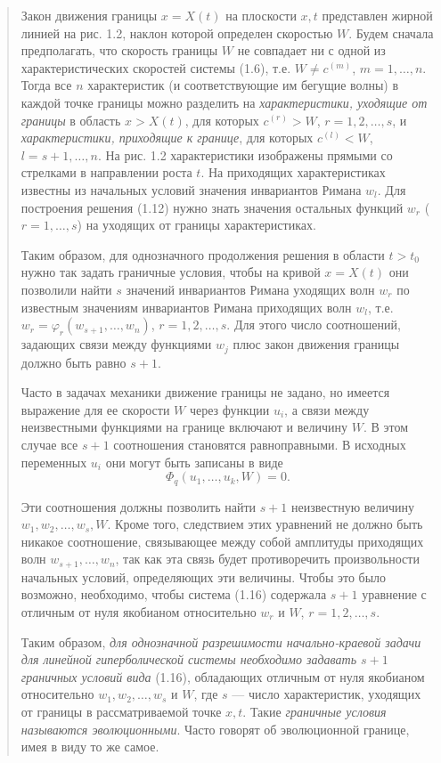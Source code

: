 \documentclass[12pt,a4paper]{article}
\begin{document}
\begin{quote}\sloppy
Закон движения границы $x=X(t)$ на плоскости $x,t$ представлен жирной линией на рис. 1.2, наклон которой определен скоростью $W$. Будем сначала предполагать, что скорость границы $W$ не совпадает ни с одной из характеристических скоростей системы (1.6), т.е. $W\ne c^{(m)}$, $m=1,\ldots,n$. Тогда все $n$ характеристик (и соответствующие им бегущие волны) в каждой точке границы можно разделить на \textit{характеристики, уходящие от границы} в область $x>X(t)$, для которых $c^{(r)}>W$, $r=1,2,\ldots,s$, и \textit{характеристики, приходящие к границе}, для которых $c^{(l)}<W$, $l=s+1,\ldots,n$. На рис. 1.2 характеристики изображены прямыми со стрелками в направлении роста $t$. На приходящих характеристиках известны из начальных условий значения инвариантов Римана $w_l$. Для построения решения (1.12) нужно знать значения остальных функций $w_r$ ($r=1,\ldots,s$) на уходящих от границы характеристиках.

Таким образом, для однозначного продолжения решения в области $t>t_0$ нужно так задать граничные условия, чтобы на кривой $x=X(t)$ они позволили найти $s$ значений инвариантов Римана уходящих волн $w_r$ по известным значениям инвариантов Римана приходящих волн $w_l$, т.е. $w_r=\varphi_r(w_{s+1},\ldots,w_n)$, $r=1,2,\ldots,s$. Для этого число соотношений, задающих связи между функциями $w_j$ плюс закон движения границы должно быть равно $s+1$.

Часто в задачах механики движение границы не задано, но имеется выражение для ее скорости $W$ через функции $u_i$, а связи между неизвестными функциями на границе включают и величину $W$. В этом случае все $s+1$ соотношения становятся равноправными. В исходных переменных $u_i$ они могут быть записаны в виде
\begin{equation}\Phi_q(u_1,\ldots,u_k,W)=0.\tag{1.16}\label{q12:eq-1-16}\end{equation}


Эти соотношения должны позволить найти $s+1$ неизвестную величину $w_1,w_2,\ldots,w_s,W$. Кроме того, следствием этих уравнений не должно быть никакое соотношение, связывающее между собой амплитуды приходящих волн $w_{s+1},\ldots,w_n$, так как эта связь будет противоречить произвольности начальных условий, определяющих эти величины. Чтобы это было возможно, необходимо, чтобы система (1.16) содержала $s+1$ уравнение с отличным от нуля якобианом относительно $w_r$ и $W$, $r=1,2,\ldots,s$.

Таким образом, \textit{для однозначной разрешимости начально-краевой задачи для линейной гиперболической системы необходимо задавать $s+1$ граничных условий вида} (1.16), обладающих отличным от нуля якобианом относительно $w_1,w_2,\ldots,w_s$ и $W$, где $s$ --- число характеристик, уходящих от границы в рассматриваемой точке $x,t$. Такие \textit{граничные условия называются эволюционными}. Часто говорят об эволюционной границе, имея в виду то же самое.
\par\nobreak{}\par
\end{quote}
\end{document}
